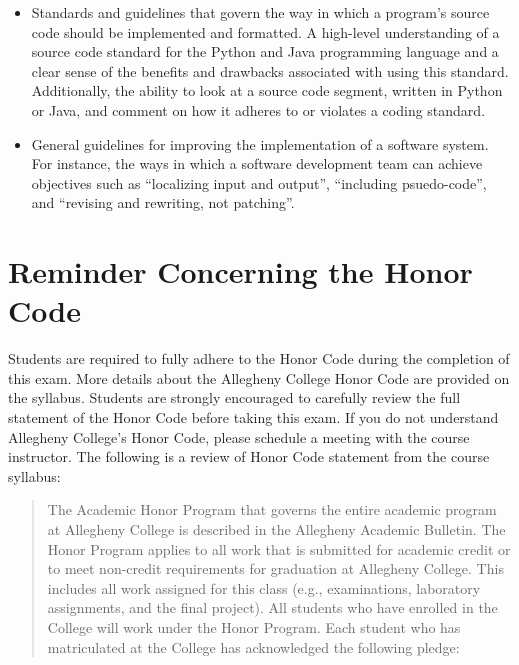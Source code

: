 \documentclass[11pt]{article}
\begin{document}
\begin{itemize}
  \item Standards and guidelines that govern the way in which a program's source
    code should be implemented and formatted. A high-level understanding of a
    source code standard for the Python and Java programming language and a
    clear sense of the benefits and drawbacks associated with using this
    standard. Additionally, the ability to look at a source code segment,
    written in Python or Java, and comment on how it adheres to or violates a
    coding standard.

  \item General guidelines for improving the implementation of a software
    system. For instance, the ways in which a software development team can
    achieve objectives such as ``localizing input and output'', ``including
    psuedo-code'', and ``revising and rewriting, not patching''.

\end{itemize}

\section*{Reminder Concerning the Honor Code}

\noindent Students are required to fully adhere to the Honor Code during the
completion of this exam. More details about the Allegheny College Honor Code are
provided on the syllabus. Students are strongly encouraged to carefully review
the full statement of the Honor Code before taking this exam. If you do not
understand Allegheny College's Honor Code, please schedule a meeting with the
course instructor. The following is a review of Honor Code statement from the
course syllabus:

\begin{quote}

  The Academic Honor Program that governs the entire academic program at
  Allegheny College is described in the Allegheny Academic Bulletin. The Honor
  Program applies to all work that is submitted for academic credit or to meet
  non-credit requirements for graduation at Allegheny College. This includes all
  work assigned for this class (e.g., examinations, laboratory assignments, and
  the final project). All students who have enrolled in the College will work
  under the Honor Program. Each student who has matriculated at the College has
  acknowledged the following pledge:

\end{quote}
\end{document}
